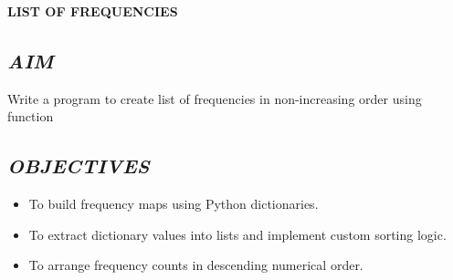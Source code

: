 \documentclass[11pt,a4paper]{article}
\begin{document}
\vspace{0.2cm}
\begin{center}
{\Huge \textbf{\textcolor{navyblue}{LIST OF FREQUENCIES}}}
\end{center}
\vspace{0.3cm}

\subsection*{\textit{AIM}}
Write a program to create list of frequencies in non-increasing order using function

\subsection*{\textit{OBJECTIVES}}
\begin{itemize}
  \item To build frequency maps using Python dictionaries.
  \item To extract dictionary values into lists and implement custom sorting logic.
  \item To arrange frequency counts in descending numerical order.
\end{itemize}
\end{document}
